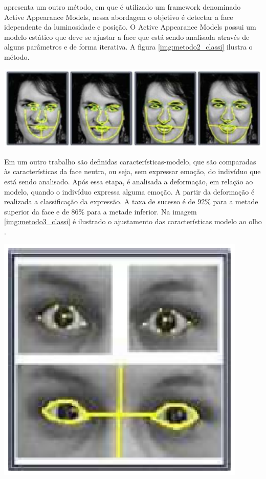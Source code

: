 \cite{Edwards} apresenta um outro método, em que é utilizado um framework denominado Active Appearance Models, nessa abordagem o objetivo é detectar a face idependente da luminosidade e posição. O  Active Appearance Models
possui um modelo estático que deve se ajustar a face que está sendo analisada através de alguns parâmetros e de forma iterativa. A figura \ref{img:metodo2_classi} ilustra o método.
\begin{center}
	\includegraphics[scale=0.5]{graficos/metodo2_classi}
	\label{img:metodo2_classi}
\end{center}

Em um outro trabalho são definidas características-modelo, que são comparadas às características da face neutra, ou seja, sem expressar emoção, do indivíduo que está sendo analisado. Após essa etapa, é analisada a deformação, em relação ao modelo, quando o indivíduo expressa alguma emoção. A partir da deformação é realizada a classificação da expressão. A taxa de sucesso é de 92\% para a metade superior da face e de
86\% para a metade inferior. Na imagem \ref{img:metodo3_classi} é ilustrado o ajustamento das características modelo ao olho \cite{Pantic}.
\begin{center}
	\includegraphics[scale=0.5]{graficos/metodo3_classi}
	\label{img:metodo3_classi}
\end{center}

